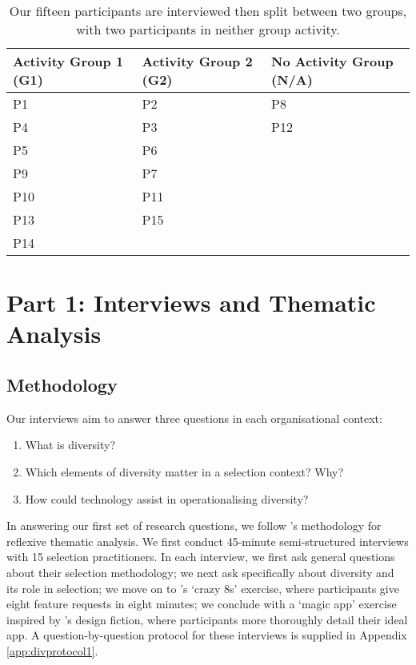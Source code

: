 \begin{center}
\begin{table}[htbp]
    \centering
    \caption{Our fifteen participants are interviewed then split between two groups, with two participants in neither group activity.}
    \label{tab:participants}
    \begin{tabular}{l l l}
        \toprule
        Activity Group 1 (G1) & Activity Group 2 (G2) & No Activity Group (N/A)\\
        \midrule
        P1 & P2 & P8 \\
        P4 & P3 & P12 \\
        P5 & P6 & \\
        P9 & P7 & \\
        P10 & P11 & \\
        P13 & P15 & \\
        P14 & & \\
        \bottomrule
    \end{tabular}
\end{table}
\end{center}

\section{Part 1: Interviews and Thematic Analysis}\label{sec:study1}
\subsection{Methodology}\label{ssec:methods1}
Our interviews aim to answer three questions in each organisational context:

\begin{enumerate}
    \item What is diversity?
    \item Which elements of diversity matter in a selection context? Why?
    \item How could technology assist in operationalising diversity?
\end{enumerate}

In answering our first set of research questions, we follow \textcite{braun_using_2006}'s methodology for reflexive thematic analysis. We first conduct 45-minute semi-structured interviews with 15 selection practitioners. In each interview, we first ask general questions about their selection methodology; we next ask specifically about diversity and its role in selection; we move on to \textcite{Knapp_Zeratzky_Kowitz_2016}'s `crazy 8s' exercise, where participants give eight feature requests in eight minutes; we conclude with a `magic app' exercise inspired by \textcite{blythe2014research}'s design fiction, where participants more thoroughly detail their ideal app. A question-by-question protocol for these interviews is supplied in Appendix \ref{app:divprotocol1}.

